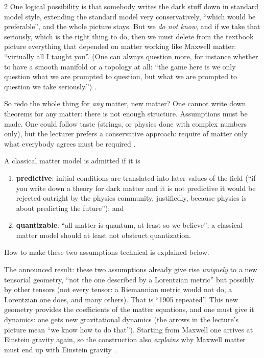 \begin{paracol}{2}
One logical possibility is that somebody writes the dark stuff down in standard model style, extending the standard model very conservatively, ``which would be preferable'', and the whole picture stays. But we \emph{do not know}, and if we take that seriously, which is the right thing to do, then we must delete from the textbook picture everything that depended on matter working like Maxwell matter: ``virtually all I taught you''. (One can always question more, for instance whether to have a smooth manifold or a topology at all: ``the game here is we only question what we are prompted to question, but what we are prompted to question we take seriously.'') .

So redo the whole thing for \emph{any} matter, new matter? One cannot write down theorems for any matter: there is not enough structure. Assumptions must be made. One could follow taste (strings, or physics done with complex numbers only), but the lecturer prefers a conservative approach: require of matter only what everybody agrees must be required .

\begin{definition}\label{def:c26-assumptions}
A classical matter model is admitted if it is
\begin{enumerate}
  \item \textbf{predictive}: initial conditions are translated into later values of the field (``if you write down a theory for dark matter and it is not predictive it would be rejected outright by the physics community, justifiedly, because physics is about predicting the future''); and
  \item \textbf{quantizable}: ``all matter is quantum, at least so we believe''; a classical matter model should at least not obstruct quantization.
\end{enumerate}
How to make these two assumptions technical is explained below.
\end{definition}

The announced result: these two assumptions already give rise \emph{uniquely} to a new tensorial geometry, ``not the one described by a Lorentzian metric'' but possibly by other tensors (not every tensor: a Riemannian metric would not do, a Lorentzian one does, and many others). That is ``1905 repeated''. This new geometry provides the coefficients of the matter equations, and one must give it dynamics: one gets new gravitational dynamics (the arrows in the lecture's picture mean ``we know how to do that''). Starting from Maxwell one arrives at Einstein gravity again, so the construction also \emph{explains} why Maxwell matter must end up with Einstein gravity .


\end{paracol}
